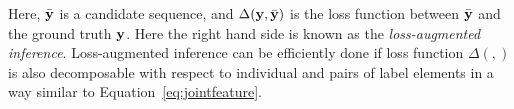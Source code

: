 
Here, $\bar{\mathbf{y}}$ is a candidate sequence,  %
and $\Delta(\mathbf{y}, \bar{\mathbf{y}})$ is the loss function between $\bar{\mathbf{y}}$ and the ground truth $\mathbf{y}$. 
Here the right hand side is known as the \emph{loss-augmented inference}. 
Loss-augmented inference can be efficiently done if loss function $\Delta(,)$ is also decomposable 
with respect to individual and pairs of label elements in a way similar to Equation~\eqref{eq:jointfeature}.



